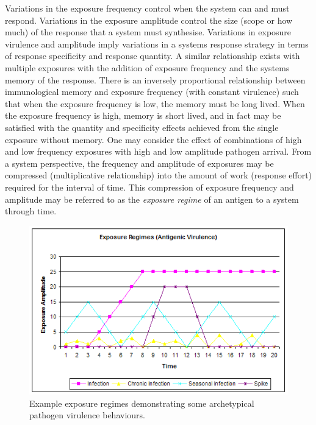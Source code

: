 Variations in the exposure frequency control when the system can and must respond. Variations in the exposure amplitude control the size (scope or how much) of the response that a system must synthesise. Variations in exposure virulence and amplitude imply variations in a systems response strategy in terms of response specificity and response quantity. A similar relationship exists with multiple exposures with the addition of exposure frequency and the systems memory of the response. There is an inversely proportional relationship between immunological memory and exposure frequency (with constant virulence) such that when the exposure frequency is low, the memory must be long lived. When the exposure frequency is high, memory is short lived, and in fact may be satisfied with the quantity and specificity effects achieved from the single exposure without memory. One may consider the effect of combinations of high and low frequency exposures with high and low amplitude pathogen arrival. From a system perspective, the frequency and amplitude of exposures may be compressed (multiplicative relationship) into the amount of work (response effort) required for the interval of time. This compression of exposure frequency and amplitude may be referred to as the \emph{exposure regime} of an antigen to a system through time.

\begin{figure}[ht]
	\centering
	\includegraphics[scale=0.70]{Cells/exposures-virulence}
	\caption{Example exposure regimes demonstrating some archetypical pathogen virulence behaviours.}
	\label{pic:cells:virulence}
\end{figure}

